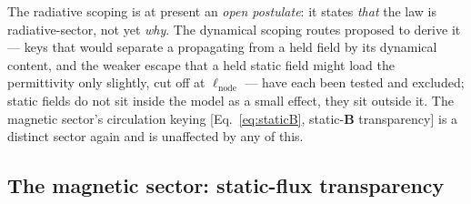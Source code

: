 \documentclass[aps,prd,twocolumn,superscriptaddress,nofootinbib,longbibliography]{revtex4-2}
\begin{document}
The radiative scoping is at present an \emph{open postulate}: it states
\emph{that} the law is radiative-sector, not yet \emph{why}. The dynamical
scoping routes proposed to derive it --- keys that would separate a propagating
from a held field by its dynamical content, and the weaker escape that a held
static field might load the permittivity only slightly, cut off at
$\ell_{\mathrm{node}}$ --- have each been tested and excluded; static fields do
not sit inside the model as a small effect, they sit outside it. The magnetic
sector's circulation keying [Eq.~\eqref{eq:staticB}, static-$\mathbf B$
transparency] is a distinct sector again and is unaffected by any of this.

\subsection{The magnetic sector: static-flux transparency}
\end{document}
